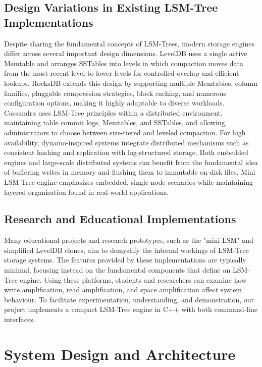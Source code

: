 \documentclass{mnitjaipur}
\begin{document}
\section{Design Variations in Existing LSM-Tree Implementations}

Despite sharing the fundamental concepts of LSM-Trees, modern storage engines differ across several important design dimensions. LevelDB uses a single active Memtable and arranges SSTables into levels in which compaction moves data from the most recent level to lower levels for controlled overlap and efficient lookups. RocksDB extends this design by supporting multiple Memtables, column families, pluggable compression strategies, block caching, and numerous configuration options, making it highly adaptable to diverse workloads. Cassandra uses LSM-Tree principles within a distributed environment, maintaining table commit logs, Memtables, and SSTables, and allowing administrators to choose between size-tiered and leveled compaction. For high availability, dynamo-inspired systems integrate distributed mechanisms such as consistent hashing and replication with log-structured storage. Both embedded engines and large-scale distributed systems can benefit from the fundamental idea of buffering writes in memory and flushing them to immutable on-disk files. Mini LSM-Tree engine emphasizes embedded, single-node scenarios while maintaining layered organisation found in real-world applications.

\section{Research and Educational Implementations}

Many educational projects and research prototypes, such as the "mini-LSM" and simplified LevelDB clones, aim to demystify the internal workings of LSM-Tree storage systems. The features provided by these implementations are typically minimal, focusing instead on the fundamental components that define an LSM-Tree engine. Using these platforms, students and researchers can examine how write amplification, read amplification, and space amplification affect system behaviour. To facilitate experimentation, understanding, and demonstration, our project implements a compact LSM-Tree engine in C++ with both command-line interfaces.


\newpage

\chapter{System Design and Architecture}
\end{document}

